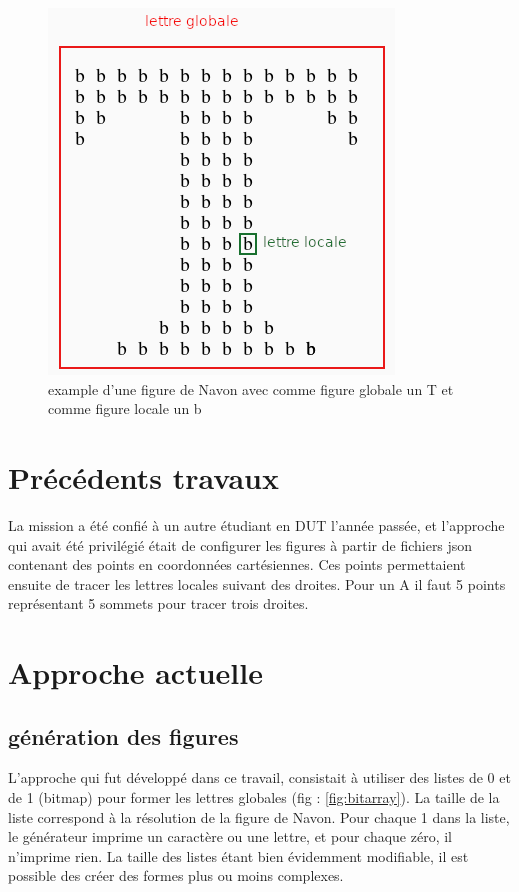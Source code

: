 \documentclass{article}
\begin{document}
\begin{figure}[!h]
	\centering
	\includegraphics[scale=0.6]{./images/figureT.png}
	\caption{example d'une figure de Navon avec comme figure globale un T et comme figure locale un b}
	\label{fig:figure_Navon}
\end{figure}

\newpage
\section{Précédents travaux}
La mission a été confié à un autre étudiant en DUT l'année passée, et l'approche qui avait été privilégié était de configurer les figures à partir de fichiers json contenant des points en coordonnées cartésiennes. Ces points permettaient ensuite de tracer les lettres locales suivant des droites. Pour un A il faut 5 points représentant 5 sommets pour tracer trois droites.


\section{Approche actuelle}
\subsection{génération des figures}
L'approche qui fut développé dans ce travail, consistait à utiliser des listes de 0 et de 1 (bitmap) pour former les lettres globales (fig : \ref{fig:bitarray}). La taille de la liste correspond à la résolution de la figure de Navon. Pour chaque 1 dans la liste, le générateur imprime un caractère ou une lettre, et pour chaque zéro, il n'imprime rien. La taille des listes étant bien évidemment modifiable, il est possible des créer des formes plus ou moins complexes. 
\end{document}
